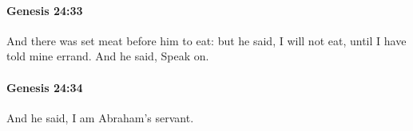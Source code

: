 		\paragraph{Genesis 24:33} %
			\label{GENESIS-24-33}

			And there was set meat before him to eat: but he said, I will not eat, until I have told mine errand. And he said, Speak on.


		\paragraph{Genesis 24:34} %
			\label{GENESIS-24-34}

			And he said, I am Abraham's servant.


